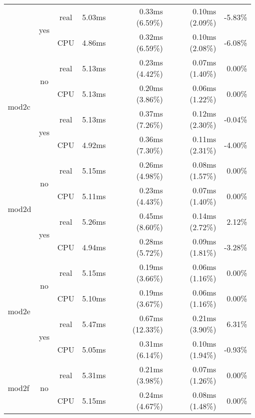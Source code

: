 \documentclass[en]{pracamgr}
\begin{document}
\begin{small}
\begin{longtable}{|l|c|c|r|r|r|r|}
                          \cline{2-7}
                          & \multirow{2}{*}{yes} & real & 5.03ms & 0.33ms (6.59\%) & 0.10ms (2.09\%) & -5.83\% \\*
                          &                      & CPU  & 4.86ms & 0.32ms (6.59\%) & 0.10ms (2.08\%) & -6.08\% \\
\hline
\multirow{4}{*}{mod2c}    & \multirow{2}{*}{no}  & real & 5.13ms & 0.23ms (4.42\%) & 0.07ms (1.40\%) & 0.00\% \\*
                          &                      & CPU  & 5.13ms & 0.20ms (3.86\%) & 0.06ms (1.22\%) & 0.00\% \\*
                          \cline{2-7}
                          & \multirow{2}{*}{yes} & real & 5.13ms & 0.37ms (7.26\%) & 0.12ms (2.30\%) & -0.04\% \\*
                          &                      & CPU  & 4.92ms & 0.36ms (7.30\%) & 0.11ms (2.31\%) & -4.00\% \\
\hline
\multirow{4}{*}{mod2d}    & \multirow{2}{*}{no}  & real & 5.15ms & 0.26ms (4.98\%) & 0.08ms (1.57\%) & 0.00\% \\*
                          &                      & CPU  & 5.11ms & 0.23ms (4.43\%) & 0.07ms (1.40\%) & 0.00\% \\*
                          \cline{2-7}
                          & \multirow{2}{*}{yes} & real & 5.26ms & 0.45ms (8.60\%) & 0.14ms (2.72\%) & 2.12\% \\*
                          &                      & CPU  & 4.94ms & 0.28ms (5.72\%) & 0.09ms (1.81\%) & -3.28\% \\
\hline
\multirow{4}{*}{mod2e}    & \multirow{2}{*}{no}  & real & 5.15ms & 0.19ms (3.66\%) & 0.06ms (1.16\%) & 0.00\% \\*
                          &                      & CPU  & 5.10ms & 0.19ms (3.67\%) & 0.06ms (1.16\%) & 0.00\% \\*
                          \cline{2-7}
                          & \multirow{2}{*}{yes} & real & 5.47ms & 0.67ms (12.33\%) & 0.21ms (3.90\%) & 6.31\% \\*
                          &                      & CPU  & 5.05ms & 0.31ms (6.14\%) & 0.10ms (1.94\%) & -0.93\% \\
\hline
\multirow{4}{*}{mod2f}    & \multirow{2}{*}{no}  & real & 5.31ms & 0.21ms (3.98\%) & 0.07ms (1.26\%) & 0.00\% \\*
                          &                      & CPU  & 5.15ms & 0.24ms (4.67\%) & 0.08ms (1.48\%) & 0.00\% \\*

\end{longtable}
\end{small}
\end{document}
